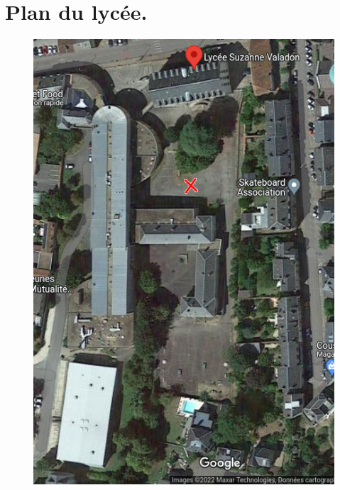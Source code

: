 \documentclass[12pt,a4paper,notitlepage,twoside]{article}
\begin{document}
\section*{Plan du lycée.}
\begin{figure}
	\centering
	\includegraphics{valadon.png}
\end{figure}
\vfill

\newpage
\end{document}
